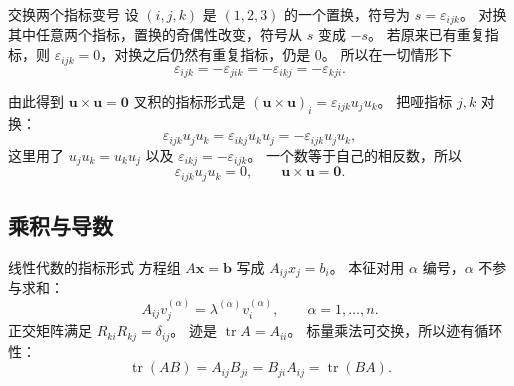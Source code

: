 \documentclass[fontset=windows, chinese, 10pt, xcolor=dvipsnames]{beamer}
\begin{document}
\begin{frame}{交换两个指标变号}
  设 $(i,j,k)$ 是 $(1,2,3)$ 的一个置换，符号为 $s=\varepsilon_{ijk}$。
  对换其中任意两个指标，置换的奇偶性改变，符号从 $s$ 变成 $-s$。
  若原来已有重复指标，则 $\varepsilon_{ijk}=0$，对换之后仍然有重复指标，仍是 $0$。
  所以在一切情形下
  \begin{equation*}
    \varepsilon_{ijk}=-\varepsilon_{jik}
    =-\varepsilon_{ikj}
    =-\varepsilon_{kji}.
  \end{equation*}
\end{frame}

\begin{frame}{由此得到 $\mathbf{u}\times\mathbf{u}=\mathbf{0}$}
  叉积的指标形式是
  $(\mathbf{u}\times\mathbf{u})_i=\varepsilon_{ijk}u_j u_k$。
  把哑指标 $j,k$ 对换：
  \begin{equation*}
    \varepsilon_{ijk}u_j u_k
    =\varepsilon_{ikj}u_k u_j
    =-\varepsilon_{ijk}u_j u_k,
  \end{equation*}
  这里用了 $u_j u_k=u_k u_j$ 以及 $\varepsilon_{ikj}=-\varepsilon_{ijk}$。
  一个数等于自己的相反数，所以
  \begin{equation*}
    \varepsilon_{ijk}u_j u_k=0,
    \qquad
    \mathbf{u}\times\mathbf{u}=\mathbf{0}.
  \end{equation*}
\end{frame}

\subsection{乘积与导数}

\begin{frame}{线性代数的指标形式}
  方程组 $A\mathbf{x}=\mathbf{b}$ 写成 $A_{ij}x_j=b_i$。
  本征对用 $\alpha$ 编号，$\alpha$ 不参与求和：
  \begin{equation*}
    A_{ij}v_j^{(\alpha)}
    =\lambda^{(\alpha)}v_i^{(\alpha)},
    \qquad \alpha=1,\ldots,n.
  \end{equation*}
  正交矩阵满足 $R_{ki}R_{kj}=\delta_{ij}$。
  迹是 $\operatorname{tr}A=A_{ii}$。
  标量乘法可交换，所以迹有循环性：
  \begin{equation*}
    \operatorname{tr}(AB)
    =A_{ij}B_{ji}
    =B_{ji}A_{ij}
    =\operatorname{tr}(BA).
  \end{equation*}
\end{frame}
\end{document}
